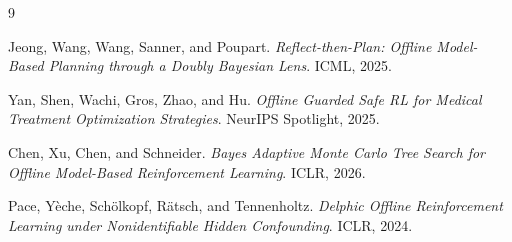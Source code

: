 \documentclass[11pt,a4paper]{article}
\begin{document}
\begin{thebibliography}{9}

Jeong, Wang, Wang, Sanner, and Poupart.
\newblock \emph{Reflect-then-Plan: Offline Model-Based Planning through a Doubly Bayesian Lens}.
\newblock ICML, 2025.

Yan, Shen, Wachi, Gros, Zhao, and Hu.
\newblock \emph{Offline Guarded Safe RL for Medical Treatment Optimization Strategies}.
\newblock NeurIPS Spotlight, 2025.

Chen, Xu, Chen, and Schneider.
\newblock \emph{Bayes Adaptive Monte Carlo Tree Search for Offline Model-Based Reinforcement Learning}.
\newblock ICLR, 2026.

Pace, Y\`eche, Sch\"olkopf, R\"atsch, and Tennenholtz.
\newblock \emph{Delphic Offline Reinforcement Learning under Nonidentifiable Hidden Confounding}.
\newblock ICLR, 2024.

\end{thebibliography}
\end{document}
